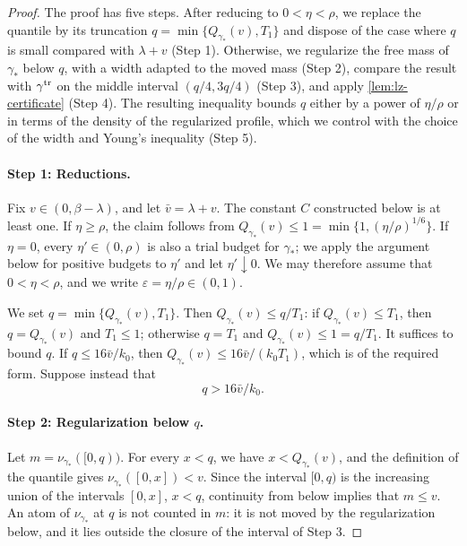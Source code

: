 \begin{proof}
The proof has five steps. After reducing to $0<\eta<\rho$, we replace the
quantile by its truncation $q=\min\{Q_{\gamma_*}(v),T_1\}$ and dispose of the
case where $q$ is small compared with $\lambda+v$ (Step 1). Otherwise, we
regularize the free mass of $\gamma_*$ below $q$, with a width adapted to the
moved mass (Step 2), compare the result with $\gamma^{\rm tr}$ on the middle
interval $(q/4,3q/4)$ (Step 3), and apply \cref{lem:lz-certificate} (Step 4).
The resulting inequality bounds $q$ either by a power of $\eta/\rho$ or in
terms of the density of the regularized profile, which we control with the
choice of the width and Young's inequality (Step 5).

\paragraph{Step 1: Reductions.}
Fix $v\in(0,\beta-\lambda)$, and let $\bar v=\lambda+v$. The constant $C$
constructed below is at least one. If $\eta\ge\rho$, the claim follows from
$Q_{\gamma_*}(v)\le1=\min\{1,(\eta/\rho)^{1/6}\}$. If $\eta=0$, every
$\eta'\in(0,\rho)$ is also a trial budget for $\gamma_*$; we apply the
argument below for positive budgets to $\eta'$ and let $\eta'\downarrow0$. We
may therefore assume that $0<\eta<\rho$, and we write
$\varepsilon=\eta/\rho\in(0,1)$.

We set $q=\min\{Q_{\gamma_*}(v),T_1\}$. Then $Q_{\gamma_*}(v)\le q/T_1$:
if $Q_{\gamma_*}(v)\le T_1$, then $q=Q_{\gamma_*}(v)$ and $T_1\le1$; otherwise
$q=T_1$ and $Q_{\gamma_*}(v)\le1=q/T_1$. It suffices to bound $q$.
If $q\le16\bar v/k_0$, then $Q_{\gamma_*}(v)\le16\bar v/(k_0T_1)$, which is of
the required form. Suppose instead that
\begin{equation}\label{eq:lz-q-large}
 q>16\bar v/k_0 .
\end{equation}

\paragraph{Step 2: Regularization below $q$.}
Let $m=\nu_{\gamma_*}([0,q))$. For every $x<q$, we have $x<Q_{\gamma_*}(v)$,
and the definition of the quantile gives $\nu_{\gamma_*}([0,x])<v$. Since the
interval $[0,q)$ is the increasing union of the intervals $[0,x]$, $x<q$,
continuity from below implies that $m\le v$. An atom of $\nu_{\gamma_*}$ at $q$ is not counted
in $m$: it is not moved by the regularization below, and it lies outside the
closure of the interval of Step 3.


\end{proof}
